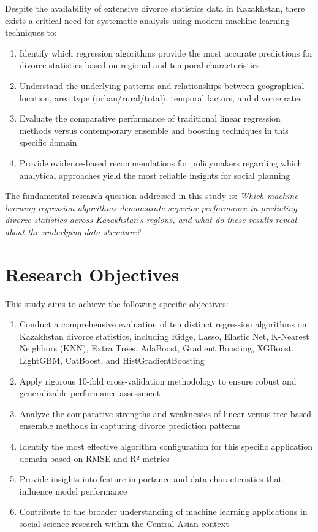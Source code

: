Despite the availability of extensive divorce statistics data in Kazakhstan, there exists a critical need for systematic analysis using modern machine learning techniques to:

\begin{enumerate}
    \item Identify which regression algorithms provide the most accurate predictions for divorce statistics based on regional and temporal characteristics
    \item Understand the underlying patterns and relationships between geographical location, area type (urban/rural/total), temporal factors, and divorce rates
    \item Evaluate the comparative performance of traditional linear regression methods versus contemporary ensemble and boosting techniques in this specific domain
    \item Provide evidence-based recommendations for policymakers regarding which analytical approaches yield the most reliable insights for social planning
\end{enumerate}

The fundamental research question addressed in this study is: \textit{Which machine learning regression algorithms demonstrate superior performance in predicting divorce statistics across Kazakhstan's regions, and what do these results reveal about the underlying data structure?}

\section{Research Objectives}

This study aims to achieve the following specific objectives:

\begin{enumerate}
    \item Conduct a comprehensive evaluation of ten distinct regression algorithms on Kazakhstan divorce statistics, including Ridge, Lasso, Elastic Net, K-Nearest Neighbors (KNN), Extra Trees, AdaBoost, Gradient Boosting, XGBoost, LightGBM, CatBoost, and HistGradientBoosting
    \item Apply rigorous 10-fold cross-validation methodology to ensure robust and generalizable performance assessment
    \item Analyze the comparative strengths and weaknesses of linear versus tree-based ensemble methods in capturing divorce prediction patterns
    \item Identify the most effective algorithm configuration for this specific application domain based on RMSE and R² metrics
    \item Provide insights into feature importance and data characteristics that influence model performance
    \item Contribute to the broader understanding of machine learning applications in social science research within the Central Asian context
\end{enumerate}

